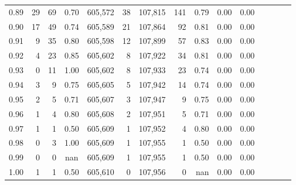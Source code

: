 \begin{tabular}{rrrcrrrrrrrrrrr}
0.89 &      29 &     69 &                                       0.70 &  605,572 &       38 &  107,815 &      141 &  0.79 &  0.00 &                         0.00 \\
0.90 &      17 &     49 &                                       0.74 &  605,589 &       21 &  107,864 &       92 &  0.81 &  0.00 &                         0.00 \\
0.91 &       9 &     35 &                                       0.80 &  605,598 &       12 &  107,899 &       57 &  0.83 &  0.00 &                         0.00 \\
0.92 &       4 &     23 &                                       0.85 &  605,602 &        8 &  107,922 &       34 &  0.81 &  0.00 &                         0.00 \\
0.93 &       0 &     11 &                                       1.00 &  605,602 &        8 &  107,933 &       23 &  0.74 &  0.00 &                         0.00 \\
0.94 &       3 &      9 &                                       0.75 &  605,605 &        5 &  107,942 &       14 &  0.74 &  0.00 &                         0.00 \\
0.95 &       2 &      5 &                                       0.71 &  605,607 &        3 &  107,947 &        9 &  0.75 &  0.00 &                         0.00 \\
0.96 &       1 &      4 &                                       0.80 &  605,608 &        2 &  107,951 &        5 &  0.71 &  0.00 &                         0.00 \\
0.97 &       1 &      1 &                                       0.50 &  605,609 &        1 &  107,952 &        4 &  0.80 &  0.00 &                         0.00 \\
0.98 &       0 &      3 &                                       1.00 &  605,609 &        1 &  107,955 &        1 &  0.50 &  0.00 &                         0.00 \\
0.99 &       0 &      0 &                                        nan &  605,609 &        1 &  107,955 &        1 &  0.50 &  0.00 &                         0.00 \\
1.00 &       1 &      1 &                                       0.50 &  605,610 &        0 &  107,956 &        0 &   nan &  0.00 &                         0.00 \\
\bottomrule
\end{tabular}
